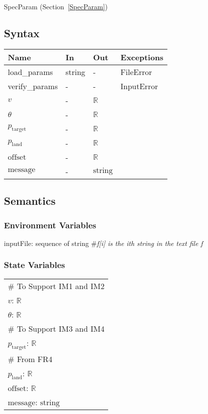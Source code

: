 \documentclass[12pt, titlepage]{article}
\begin{document}
SpecParam (Section~\ref{SpecParam})

\subsection{Syntax}

\begin{tabular}{p{3cm} p{1cm} p{1cm} >{\raggedright\arraybackslash}p{9cm}}
\toprule
\textbf{Name} & \textbf{In} & \textbf{Out} & \textbf{Exceptions} \\
\midrule
load\_params & string & - &  FileError \\
verify\_params & - & - & InputError \\
$v$ & - & $\mathbb{R}$\\
$\theta$ & - & $\mathbb{R}$\\
$p_{\text{target}}$ & - & $\mathbb{R}$\\
$p_{\text{land}}$ & - & $\mathbb{R}$\\
$\text{offset}$ & - & $\mathbb{R}$\\
$\text{message}$ & - & $\text{string}$\\
\bottomrule
\end{tabular}

\subsection{Semantics}

\subsubsection{Environment Variables}

inputFile: sequence of string \#\textit{f[i] is the ith string in the text file f}

\subsubsection{State Variables}

\renewcommand{\arraystretch}{1.2}
\begin{longtable*}[l]{l} 
\# To Support IM1 and IM2 \\
$v$: $\mathbb{R}$\\
$\theta$: $\mathbb{R}$\\
\# To Support IM3 and IM4 \\
$p_{\text{target}}$: $\mathbb{R}$\\
\# From FR4 \\
$p_{\text{land}}$: $\mathbb{R}$\\
$\text{offset}$: $\mathbb{R}$\\
$\text{message}$: $\text{string}$\\
\end{longtable*}
\end{document}
